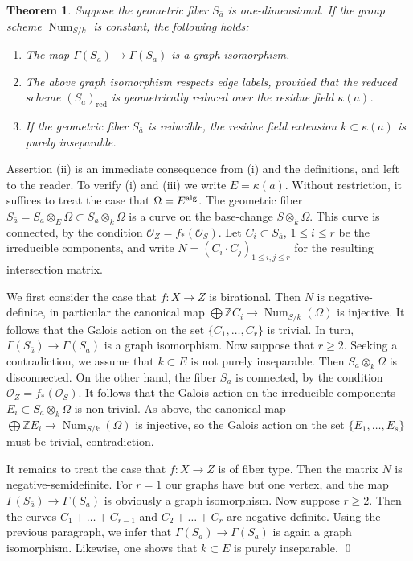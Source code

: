 \documentclass[oneside, 12pt]{amsart}
\newcommand\mylabel[1]{\label{#1}\marginpar{\vspace{-1ex}\medskip\medskip\footnotesize \tt #1}}
\renewcommand\mylabel[1]{\label{#1}}
\newtheorem{theorem}{Theorem}[section]
\theoremstyle{definition}
\theoremstyle{remark}
\newcommand{\ZZ}{\mathbb{Z}}
\newcommand{\alg}{\text{\rm alg}}
\newcommand{\Num}{\operatorname{Num}}
\renewcommand{\O}{\mathscr{O}}
\newcommand{\ra}{\rightarrow}
\newcommand{\red}{{\operatorname{red}}}
\newcommand{\ba}{{\bar{a}}}
\begin{document}
\begin{theorem}
\mylabel{geometric and schematic fiber}
Suppose the geometric fiber $S_\ba$   is one-dimensional.
If the group scheme $\Num_{S/k}$ is constant,   the following holds:
\begin{enumerate}
\item 
The map $\Gamma(S_\ba)\ra\Gamma(S_a)$ is a graph isomorphism.
\item 
The above graph isomorphism respects edge labels, provided that the  reduced scheme  $(S_a)_\red$ 
is geometrically reduced  over the residue field $\kappa(a)$.
\item 
If the geometric fiber $S_\ba$ is reducible, the residue field extension $k\subset\kappa(a)$ is purely inseparable.
\end{enumerate}
\end{theorem}


\proof
Assertion (ii) is an immediate consequence from (i) and the definitions, and left to the reader.
To verify (i) and (iii) we write  $E=\kappa(a)$. Without restriction, it suffices to treat the case that $\Omega= E^\alg$.
The geometric fiber $S_\ba=S_a\otimes_E\Omega\subset S_a\otimes_k\Omega$ is a   curve on the base-change $S\otimes_k\Omega$.
This curve is connected, by the condition $\O_Z=f_*(\O_S)$.
Let  $C_i\subset S_\ba$, $1\leq i\leq r$ be the irreducible components, and write $N=(C_i\cdot C_j)_{1\leq i,j\leq r}$
for the resulting intersection matrix.

We first consider   the case that $f:X\ra Z$ is birational. Then $N$ is negative-definite, in particular
the canonical map $\bigoplus\ZZ C_i\ra \Num_{S/k}(\Omega)$ is injective. It follows that the Galois action
on the set $\{C_1,\ldots,C_r\}$ is trivial. In turn, $\Gamma(S_\ba)\ra\Gamma(S_a)$ is a graph isomorphism.
Now suppose that $r\geq 2$. Seeking a contradiction, we assume that $k\subset E$ is not purely inseparable.
Then $S_a\otimes_k\Omega$ is disconnected. On the other hand, the fiber $S_a$ is connected,
 by the condition $\O_Z=f_*(\O_S)$.
It follows that the Galois action on the   irreducible components $E_i\subset S_a\otimes_k\Omega$
is non-trivial.
As above, the canonical map $\bigoplus\ZZ E_i\ra\Num_{S/k}(\Omega)$ is injective, so the Galois action on 
the set $\{E_1,\ldots,E_s\}$ must be trivial, contradiction.

It remains to treat the case that  $f:X\ra Z $ is of fiber type. Then the matrix $N$ is negative-semidefinite.
For $r=1$ our graphs have but one vertex, and the map $\Gamma(S_\ba)\ra\Gamma(S_a)$ is obviously a graph isomorphism.
Now suppose  $r\geq 2$. Then  the curves $C_1+\ldots+C_{r-1}$ and $C_2+\ldots+C_r$ are negative-definite. Using the 
previous paragraph,
we infer that $\Gamma(S_\ba)\ra\Gamma(S_a)$ is again a graph isomorphism. Likewise, one shows that
 $k\subset E$ is purely inseparable.
\qed
\end{document}

